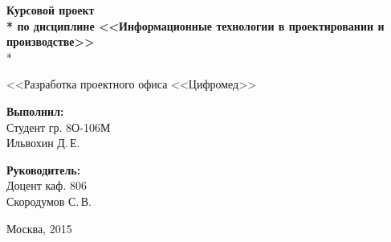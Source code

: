\begin{titlepage}
\begin{center}
\vspace{2em}

\Large \textbf{Курсовой проект \\*
по дисциплине <<Информационные технологии в проектировании и производстве>>} \\*

\vspace{2em}

<<Разработка проектного офиса <<Цифромед>>
\end{center}

\vspace{6em}

\begin{minipage}[b]{22em}
  {\bfseries Выполнил:} \\
  \indent Студент гр. 8О-106М \\
  \indent Ильвохин Д.\,Е.
\end{minipage} \begin{minipage}[b]{10em}
  {\bfseries Руководитель:} \\
  \indent Доцент каф. 806 \\
  \indent Скородумов С.\,В.
\end{minipage}
\vspace{\fill}

\begin{center}
Москва, 2015
\end{center}

\end{titlepage}

